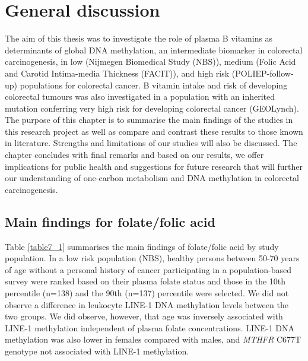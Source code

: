 \chapter{General discussion}
\label{chap7_generaldiscussion}

\newpage

\noindent The aim of this thesis was to investigate the role of plasma B vitamins as determinants of global DNA methylation, an intermediate biomarker in colorectal carcinogenesis, in low (Nijmegen Biomedical Study (NBS)), medium (Folic Acid and Carotid Intima-media Thickness (FACIT)), and high risk (POLIEP-follow-up) populations for colorectal cancer. B vitamin intake and risk of developing colorectal tumours was also investigated in a population with an inherited mutation conferring very high risk for developing colorectal cancer (GEOLynch). The purpose of this chapter is to summarise the main findings of the studies in this research project as well as compare and contrast these results to those known in literature. Strengths and limitations of our studies will also be discussed. The chapter concludes with final remarks and based on our results, we offer implications for public health and suggestions for future research that will further our understanding of one-carbon metabolism and DNA methylation in colorectal carcinogenesis.

\section{Main findings for folate/folic acid} %
\noindent Table \ref{table7_1} summarises the main findings of folate/folic acid by study population. In a low risk population (NBS), healthy persons between 50-70 years of age without a personal history of cancer participating in a population-based survey were ranked based on their plasma folate status and those in the 10th percentile (n=138) and the 90th (n=137) percentile were selected. We did not observe a difference in leukocyte LINE-1 DNA methylation levels between the two groups. We did observe, however, that age was inversely associated with LINE-1 methylation independent of plasma folate concentrations. LINE-1 DNA methylation was also lower in females compared with males, and \emph{MTHFR} C677T genotype not associated with LINE-1 methylation.


